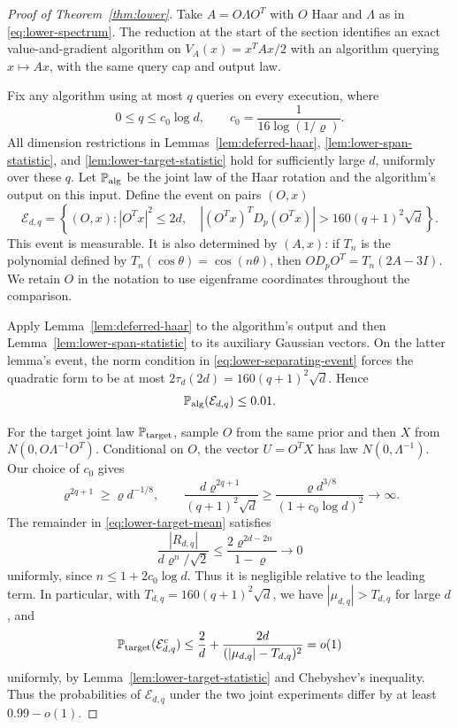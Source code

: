 \begin{proof}[Proof of Theorem~\ref{thm:lower}]
Take $A=O\Lambda O^T$ with $O$ Haar and $\Lambda$ as in
\eqref{eq:lower-spectrum}. The reduction at the start of the section identifies an exact
value-and-gradient algorithm on $V_A(x)=x^TAx/2$ with an algorithm
querying $x\mapsto Ax$, with the same query cap and output law.

Fix any algorithm using at most $q$ queries on every execution, where
\[
 0\le q\le c_0\log d,\qquad
 c_0=\frac1{16\log(1/\varrho)}.
\]
All dimension restrictions in Lemmas~\ref{lem:deferred-haar},
\ref{lem:lower-span-statistic}, and \ref{lem:lower-target-statistic}
hold for sufficiently large $d$, uniformly over these $q$.
Let $\P_{\mathrm{alg}}$ be the joint law of the Haar rotation and the
algorithm's output on this input. Define the event on pairs $(O,x)$
\begin{equation}\label{eq:lower-separating-event}
 \mathcal E_{d,q}=
 \left\{(O,x): |O^Tx|^2\le2d,\quad
       \left|(O^Tx)^TD_p(O^Tx)\right|>
                         160(q+1)^2\sqrt d\right\}.
\end{equation}
This event is measurable. It is also determined by $(A,x)$: if $T_n$
is the polynomial defined by $T_n(\cos\theta)=\cos(n\theta)$, then
$OD_pO^T=T_n(2A-3I)$. We retain $O$ in the notation to use eigenframe
coordinates throughout the comparison.

Apply Lemma~\ref{lem:deferred-haar} to the algorithm's output and then
Lemma~\ref{lem:lower-span-statistic} to its auxiliary Gaussian vectors.
On the latter lemma's event, the norm condition in
\eqref{eq:lower-separating-event} forces the quadratic form to be at
most $2\tau_d(2d)=160(q+1)^2\sqrt d$. Hence
\begin{equation}\label{eq:lower-algorithm-event}
                       \P_{\mathrm{alg}}(\mathcal E_{d,q})\le0.01.
\end{equation}

For the target joint law $\P_{\mathrm{target}}$, sample $O$ from the same
prior and then $X$ from $N(0,O\Lambda^{-1}O^T)$. Conditional on $O$, the vector
$U=O^TX$ has law $N(0,\Lambda^{-1})$. Our choice of $c_0$ gives
\[
 \varrho^{2q+1}\ge\varrho d^{-1/8},\qquad
 \frac{d\varrho^{2q+1}}{(q+1)^2\sqrt d}
 \ge\frac{\varrho d^{3/8}}{(1+c_0\log d)^2}\longrightarrow\infty.
\]
The remainder in \eqref{eq:lower-target-mean} satisfies
\[
 \frac{|R_{d,q}|}{d\varrho^n/\sqrt2}
 \le\frac{2\varrho^{2d-2n}}{1-\varrho}\longrightarrow0
\]
uniformly, since $n\le1+2c_0\log d$. Thus it is negligible relative
to the leading term. In particular,
with $T_{d,q}=160(q+1)^2\sqrt d$, we have
$|\mu_{d,q}|>T_{d,q}$ for large $d$, and
\[
 \P_{\mathrm{target}}(\mathcal E_{d,q}^c)
 \le\frac2d+
       \frac{2d}{(|\mu_{d,q}|-T_{d,q})^2}=o(1)
\]
uniformly, by Lemma~\ref{lem:lower-target-statistic} and Chebyshev's
inequality. Thus the probabilities of $\mathcal E_{d,q}$ under the
two joint experiments differ by at least $0.99-o(1)$.


\end{proof}

